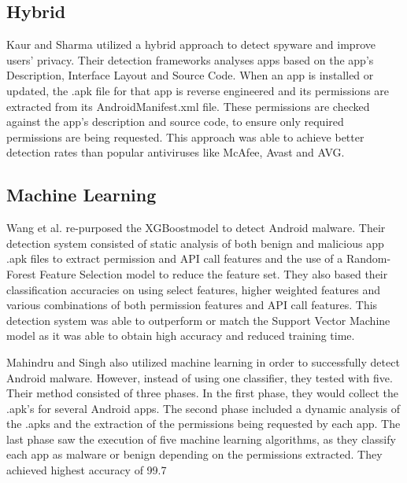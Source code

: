 \documentclass[conference]{IEEEtran}
\begin{document}
\subsection{Hybrid}
Kaur and Sharma  utilized a hybrid approach to detect spyware and improve users’ privacy. Their detection frameworks analyses apps based on the app’s Description, Interface Layout and Source Code. When an app is installed or updated, the .apk file for that app is reverse engineered and its permissions are extracted from its AndroidManifest.xml file. These permissions are checked against the app’s description and source code, to ensure only required permissions are being requested. This approach was able to achieve better detection rates than popular antiviruses like McAfee, Avast and AVG.
\subsection{Machine Learning}
Wang et al.  re-purposed the XGBoostmodel to detect Android malware. Their detection system consisted of static analysis of both benign and malicious app .apk files to extract permission and API call features and the use of a Random-Forest Feature Selection model to reduce the feature set. They also based their classification accuracies on using select features, higher weighted features and various combinations of both permission features and API call features. This detection system was able to outperform or match the Support Vector Machine model as it was able to obtain high accuracy and reduced training time.
\par Mahindru and Singh  also utilized machine learning in order to successfully detect Android malware. However, instead of using one classifier, they tested with five. Their method consisted of three phases. In the first phase, they would collect the .apk’s for several Android apps. The second phase
included a dynamic analysis of the .apks and the extraction of the permissions being requested by each app. The last phase saw the execution of five machine learning algorithms, as they classify each app as malware or benign depending on the permissions extracted. They achieved highest accuracy of 99.7%
\end{document}
